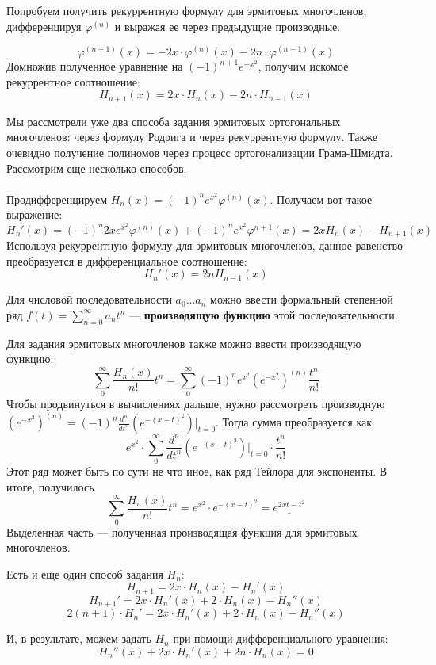 	Попробуем получить рекуррентную формулу для эрмитовых многочленов, дифференцируя $\varphi^{(n)}$ и выражая ее через предыдущие
	производные.
	
	$$ \varphi^{(n+1)}(x) = -2x \cdot \varphi^{(n)}(x) - 2n \cdot \varphi^{(n-1)}(x) $$
	Домножив полученное уравнение на $(-1)^{n+1} e^{-x^2}$, получим искомое рекуррентное соотношение:
	$$H_{n+1} (x) = 2x \cdot H_n(x) - 2n \cdot H_{n-1} (x)$$
	
	Мы рассмотрели уже два способа задания эрмитовых ортогональных многочленов: через формулу Родрига и через рекуррентную формулу.
	Также очевидно получение полиномов через процесс ортогонализации Грама-Шмидта. Рассмотрим еще несколько способов.\\ \\
	
	Продифференцируем $H_n(x) = (-1)^n e^{x^2} \varphi^{(n)}(x)$. Получаем вот такое выражение:
	$$H_n'(x) = (-1)^n 2x e^{x^2} \varphi^{(n)}(x) + (-1)^n e^{x^2} \varphi^{n+1}(x) = 2x H_n(x) - H_{n+1}(x)$$
	Используя рекуррентную формулу для эрмитовых многочленов, данное равенство преобразуется в дифференциальное соотношение:
	$$H_n'(x) = 2n H_{n-1}(x)$$
	
	\begin{defi}
	Для числовой последовательности $a_0 \dots a_n$ можно ввести формальный степенной ряд $f(t) = \sum_{n=0}^{\infty} a_n t^n$ 
	--- \textbf{производящую функцию} этой последовательности.
	\end{defi}
	
	Для задания эрмитовых многочленов также можно ввести производящую функцию:
	$$\sum_0^{\infty} \frac{H_n(x)}{n!} t^n = \sum_0^{\infty} (-1)^n e^{x^2} (e^{-x^2})^{(n)} \frac{t^n}{n!}$$
	Чтобы продвинуться в вычислениях дальше, нужно рассмотреть производную $(e^{-x^2})^{(n)} =
	(-1)^n \frac{d^n}{dt^n} (e^{-(x-t)^2}) |_{t=0}$. Тогда сумма преобразуется как:
	$$e^{x^2} \cdot \sum_0^{\infty} \frac{d^n}{dt^n} (e^{-(x-t)^2}) |_{t=0} \cdot \frac{t^n}{n!}$$
	Этот ряд может быть по сути не что иное, как ряд Тейлора для экспоненты. В итоге, получилось
	$$\sum_0^{\infty} \frac{H_n(x)}{n!} t^n = e^{x^2} \cdot e^{-(x-t)^2} = \underline{e^{2xt - t^2}}$$
	Выделенная часть --- полученная производящая функция для эрмитовых многочленов.
	
	Есть и еще один способ задания $H_n$:
	$$H_{n+1} = 2x \cdot H_n(x) - H_n'(x)$$
	$$H_{n+1}' = 2x \cdot H_n'(x) + 2 \cdot H_n(x) - H_n''(x)$$
	$$2(n+1) \cdot H_n' = 2x \cdot H_n'(x) + 2 \cdot H_n(x) - H_n''(x)$$
	
	И, в результате, можем задать $H_n$ при помощи дифференциального уравнения:
	$$H_n''(x) + 2x \cdot H_n'(x) + 2n \cdot H_n(x) = 0$$
	
